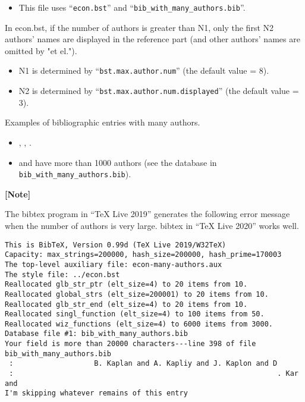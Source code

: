 \documentclass[10pt]{article}
\begin{document}
\begin{itemize}
 \item This file uses ``\texttt{econ.bst}'' and ``\verb|bib_with_many_authors.bib|''.
\end{itemize}

\vspace*{1em}

In econ.bst, if the number of authors is greater than N1, only the first N2
authors' names are displayed in the reference part (and other authors' names are
omitted by "et el.").
\begin{itemize}
 \item N1 is determined by ``\texttt{bst.max.author.num}'' (the default value = 8).
 \item N2 is determined by ``\texttt{bst.max.author.num.displayed}'' (the default value = 3).
\end{itemize}

\vspace*{1em}

\noindent Examples of bibliographic entries with many authors.
\begin{itemize}
 \item \citet{Pilia_2020}, \citet{Abbott_2016}, \citet{LHC_Physics_Letters_20121}.
 \item \citet{Abbott_2016} and \citet{LHC_Physics_Letters_20121} have more than
       1000 authors (see the database in \verb|bib_with_many_authors.bib|).
\end{itemize}

\vspace*{1em}

\noindent \textbf{[Note]}

The bibtex program in ``TeX Live 2019'' generates the following error message when the
number of authors is very large. bibtex in ``TeX Live 2020'' works well.
\small
\begin{verbatim}
This is BibTeX, Version 0.99d (TeX Live 2019/W32TeX)
Capacity: max_strings=200000, hash_size=200000, hash_prime=170003
The top-level auxiliary file: econ-many-authors.aux
The style file: ../econ.bst
Reallocated glb_str_ptr (elt_size=4) to 20 items from 10.
Reallocated global_strs (elt_size=200001) to 20 items from 10.
Reallocated glb_str_end (elt_size=4) to 20 items from 10.
Reallocated singl_function (elt_size=4) to 100 items from 50.
Reallocated wiz_functions (elt_size=4) to 6000 items from 3000.
Database file #1: bib_with_many_authors.bib
Your field is more than 20000 characters---line 398 of file bib_with_many_authors.bib
 :                   B. Kaplan and A. Kapliy and J. Kaplon and D
 :                                                              . Kar and
I'm skipping whatever remains of this entry        
\end{verbatim}
\normalsize



\end{document}
